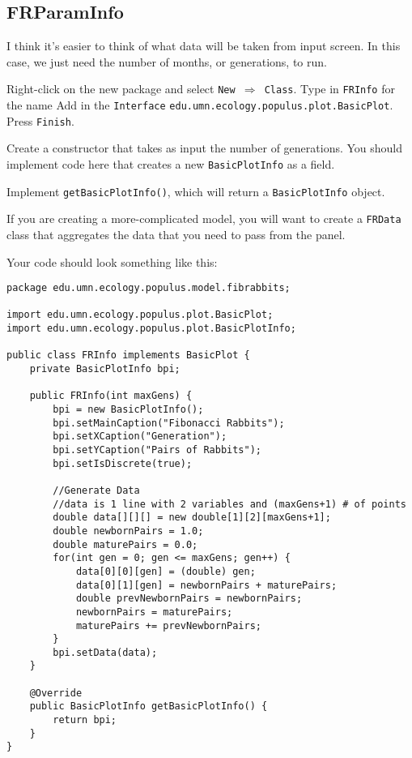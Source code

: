 \documentclass[12pt]{article}
\begin{document}
\subsection{FRParamInfo}
I think it's easier to think of what data will be taken from input screen.  In this case, we just need the number of months, or generations, to run.

Right-click on the new package and select \texttt{New $\Rightarrow$ Class}.
Type in \texttt{FRInfo} for the name
Add in the \texttt{Interface} \texttt{edu.umn.ecology.populus.plot.BasicPlot}.
Press \texttt{Finish}.

Create a constructor that takes as input the number of generations.  You should implement code here that creates a new \texttt{BasicPlotInfo} as a field.

Implement \texttt{getBasicPlotInfo()}, which will return a \texttt{BasicPlotInfo} object.

If you are creating a more-complicated model, you will want to create a \texttt{FRData} class that aggregates the data that you need to pass from the panel.

Your code should look something like this:

\begin{verbatim}
package edu.umn.ecology.populus.model.fibrabbits;

import edu.umn.ecology.populus.plot.BasicPlot;
import edu.umn.ecology.populus.plot.BasicPlotInfo;

public class FRInfo implements BasicPlot {
    private BasicPlotInfo bpi;

    public FRInfo(int maxGens) {
        bpi = new BasicPlotInfo();
        bpi.setMainCaption("Fibonacci Rabbits");
        bpi.setXCaption("Generation");
        bpi.setYCaption("Pairs of Rabbits");
        bpi.setIsDiscrete(true);
		
        //Generate Data
        //data is 1 line with 2 variables and (maxGens+1) # of points
        double data[][][] = new double[1][2][maxGens+1]; 
        double newbornPairs = 1.0;
        double maturePairs = 0.0;
        for(int gen = 0; gen <= maxGens; gen++) {
            data[0][0][gen] = (double) gen;
            data[0][1][gen] = newbornPairs + maturePairs;
            double prevNewbornPairs = newbornPairs;
            newbornPairs = maturePairs;
            maturePairs += prevNewbornPairs;
        }
        bpi.setData(data);
    }
	
    @Override
    public BasicPlotInfo getBasicPlotInfo() {
        return bpi;
    }
}
\end{verbatim}
\end{document}
